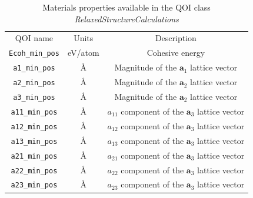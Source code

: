 \begin{table}[p]
	\centering
	\caption{Materials properties available in the QOI class \emph{RelaxedStructureCalculations}}
	\label{tbl:pypospack_qoi_lmps_min_all}
	\begin{tabular}{ccc}
		\hline
		QOI name & Units & Description \\
		\verb|Ecoh_min_pos|
			& eV/atom
			& Cohesive energy\\
		\verb|a1_min_pos|
			& \AA
			& Magnitude of the $\bm{a}_1$ lattice vector \\
		\verb|a2_min_pos|
			& \AA
			& Magnitude of the $\bm{a}_2$ lattice vector \\
		\verb|a3_min_pos|
			& \AA
			& Magnitude of the $\bm{a}_2$ lattice vector \\
		\verb|a11_min_pos|
			& \AA
			& $a_{11}$ component of the $\bm{a}_3$ lattice vector \\
		\verb|a12_min_pos|
			& \AA
			& $a_{12}$ component of the $\bm{a}_3$ lattice vector \\
		\verb|a13_min_pos|
			& \AA
			& $a_{13}$ component of the $\bm{a}_3$ lattice vector \\
		\verb|a21_min_pos|
			& \AA
			& $a_{21}$ component of the $\bm{a}_3$ lattice vector \\
		\verb|a22_min_pos|
			& \AA
			& $a_{22}$ component of the $\bm{a}_3$ lattice vector \\
		\verb|a23_min_pos|
			& \AA
			& $a_{23}$ component of the $\bm{a}_3$ lattice vector \\
		\hline
	\end{tabular}
\end{table}

